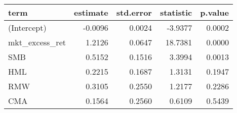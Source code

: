 \begin{table}[ht]
\centering
\begin{tabular}{lrrrr}
  \hline
term & estimate & std.error & statistic & p.value \\ 
  \hline
(Intercept) & -0.0096 & 0.0024 & -3.9377 & 0.0002 \\ 
  mkt\_excess\_ret & 1.2126 & 0.0647 & 18.7381 & 0.0000 \\ 
  SMB & 0.5152 & 0.1516 & 3.3994 & 0.0013 \\ 
  HML & 0.2215 & 0.1687 & 1.3131 & 0.1947 \\ 
  RMW & 0.3105 & 0.2550 & 1.2177 & 0.2286 \\ 
  CMA & 0.1564 & 0.2560 & 0.6109 & 0.5439 \\ 
   \hline
\end{tabular}
\label{tab: summary_neg_EW}
\end{table}

